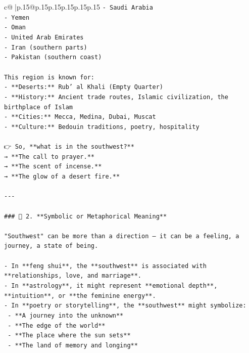 \documentclass{article}
\begin{document}
{\begin{supertabular}{c@{$\;$}|p{.15\linewidth}@{}p{.15\linewidth}p{.15\linewidth}p{.15\linewidth}p{.15\linewidth}p{.15\linewidth}}
{{{\texttt{{-} Saudi Arabia} \\
\texttt{{-} Yemen} \\
\texttt{{-} Oman} \\
\texttt{{-} United Arab Emirates} \\
\texttt{{-} Iran (southern parts)} \\
\texttt{{-} Pakistan (southern coast)} \\
\\ 
\texttt{This region is known for:} \\
\texttt{{-} **Deserts:** Rub' al Khali (Empty Quarter)} \\
\texttt{{-} **History:** Ancient trade routes, Islamic civilization, the birthplace of Islam} \\
\texttt{{-} **Cities:** Mecca, Medina, Dubai, Muscat} \\
\texttt{{-} **Culture:** Bedouin traditions, poetry, hospitality} \\
\\ 
\texttt{👉 So, **what is in the southwest?**  } \\
\texttt{→ **The call to prayer.**  } \\
\texttt{→ **The scent of incense.**  } \\
\texttt{→ **The glow of a desert fire.**} \\
\\ 
\texttt{{-}{-}{-}} \\
\\ 
\texttt{\#\#\# 🔹 2. **Symbolic or Metaphorical Meaning**} \\
\\ 
\texttt{"Southwest" can be more than a direction — it can be a feeling, a journey, a state of being.} \\
\\ 
\texttt{{-} In **feng shui**, the **southwest** is associated with **relationships, love, and marriage**.} \\
\texttt{{-} In **astrology**, it might represent **emotional depth**, **intuition**, or **the feminine energy**.} \\
\texttt{{-} In **poetry or storytelling**, the **southwest** might symbolize:} \\
\texttt{  {-} **A journey into the unknown**} \\
\texttt{  {-} **The edge of the world**} \\
\texttt{  {-} **The place where the sun sets**} \\
\texttt{  {-} **The land of memory and longing**} \\
}}}
\end{supertabular}}
\end{document}
